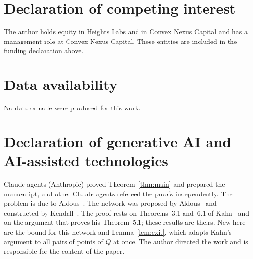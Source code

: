 \documentclass[11pt]{amsart}
\theoremstyle{remark}
\begin{document}
\section*{Declaration of competing interest}
The author holds equity in Heights Labs and in Convex Nexus Capital and has a management role at Convex Nexus Capital.
These entities are included in the funding declaration above.

\section*{Data availability}
No data or code were produced for this work.

\section*{Declaration of generative AI and AI-assisted technologies}
Claude agents (Anthropic) proved Theorem~\ref{thm:main} and prepared the manuscript, and other Claude agents refereed
the proofs independently. The problem is due to Aldous~\cite{Aldous}. The network was proposed by
Aldous~\cite{Aldous} and constructed by Kendall~\cite{Kendall}. The proof rests on Theorems~3.1 and~6.1 of
Kahn~\cite{Kahn} and on the argument that proves his Theorem~5.1; these results are theirs. New here are the bound
for this network and Lemma~\ref{lem:exit}, which adapts Kahn's argument to all pairs of points of $Q$ at once. The author directed the work and is responsible for
the content of the paper.
\end{document}
